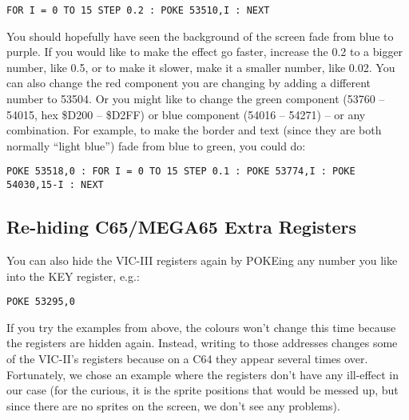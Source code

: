 \begin{tcolorbox}[colback=black,coltext=white]
\verbatimfont{\codefont}
\begin{verbatim}
FOR I = 0 TO 15 STEP 0.2 : POKE 53510,I : NEXT
\end{verbatim}
\end{tcolorbox}

You should hopefully have seen the background of the screen fade from blue to purple.  If you would like to
make the effect go faster, increase the 0.2 to a bigger number, like 0.5, or to make it slower, make it a smaller number, like 0.02.
You can also change the red component you are changing by adding a different number to 53504.  Or you might like to change the green
component (53760 -- 54015, hex \$D200 -- \$D2FF) or blue component (54016 -- 54271) -- or any combination.  For example, to make
the border and text (since they are both normally ``light blue'') fade from blue to green, you could do:

\begin{tcolorbox}[colback=black,coltext=white]
\verbatimfont{\codefont}
\begin{verbatim}
POKE 53518,0 : FOR I = 0 TO 15 STEP 0.1 : POKE 53774,I : POKE 54030,15-I : NEXT
\end{verbatim}
\end{tcolorbox}

\subsection{Re-hiding C65/MEGA65 Extra Registers}

You can also hide the VIC-III registers again by POKEing any number you like into the KEY register, e.g.:

\begin{tcolorbox}[colback=black,coltext=white]
\verbatimfont{\codefont}
\begin{verbatim}
POKE 53295,0
\end{verbatim}
\end{tcolorbox}

If you try the examples from above, the colours won't change this time because
the registers are hidden again. Instead, writing to those addresses changes some of the VIC-II's registers
because on a C64 they appear several times over.  Fortunately, we chose an example where the registers don't
have any ill-effect in our case (for the curious, it is the sprite positions that would be messed up, but
since there are no sprites on the screen, we don't see any problems).

